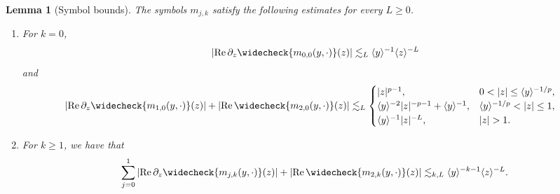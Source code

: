 \documentclass[11pt]{amsart}
\newtheorem{lemma}[theorem]{Lemma}
\theoremstyle{definition}
\theoremstyle{remark}
\numberwithin{equation}{section}
\newcommand{\ang}[1]{\langle #1 \rangle}
\begin{document}
\begin{lemma}[Symbol bounds]\label{lem:linear_nonstationary_leading_kernels}
    The symbols $m_{j,k}$ satisfy the following estimates for every $L \geq 0$.
    \begin{enumerate}
        \item For $k=0$, 
    \begin{equation}\label{eqn:linear_nonstationary_leading_kernel_j0}
        \left|\operatorname{Re}\partial_z\widecheck{m_{0,0}(y,\cdot)}(z)\right|
        \lesssim_L \ang{y}^{-1}\ang{z}^{-L}
    \end{equation}
    and
    \begin{equation}\label{eqn:linear_nonstationary_leading_kernel_j12}
    \begin{aligned}
        \left|\operatorname{Re}\partial_z\widecheck{m_{1,0}(y,\cdot)}(z)\right| + \left|\operatorname{Re}\widecheck{m_{2,0}(y,\cdot)}(z)\right| 
        &\lesssim_L
        \begin{cases}
            |z|^{p-1}, & 0<|z|\leq \ang{y}^{-1/p},\\
            \ang{y}^{-2}|z|^{-p-1}+\ang{y}^{-1}, & \ang{y}^{-1/p}<|z|\leq1,\\
            \ang{y}^{-1}|z|^{-L}, & |z|>1.
        \end{cases}
    \end{aligned}
    \end{equation}
    \item For $k \geq 1$, we have that 
    \begin{equation}\label{eqn:linear_nonstationary_higher_kernels}
        \sum_{j=0}^1\left|\operatorname{Re}\partial_z\widecheck{m_{j,k}(y,\cdot)}(z)\right|
        +\left|\operatorname{Re}\widecheck{m_{2,k}(y,\cdot)}(z)\right|
        \lesssim_{k,L}\ang{y}^{-k-1}\ang{z}^{-L}.
    \end{equation}
    \end{enumerate}
\end{lemma}
\end{document}
